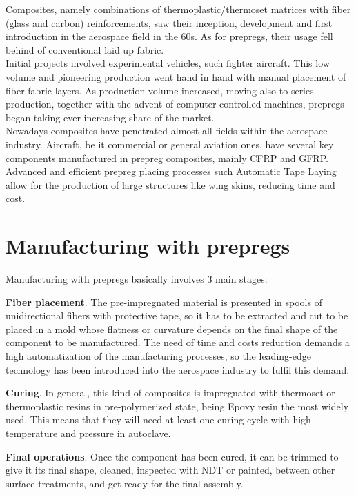 Composites, namely combinations of thermoplastic/thermoset matrices with fiber
(glass and carbon) reinforcements, saw their inception, development and first
introduction in the aerospace field in the 60s. As for prepregs, their usage fell
behind of conventional laid up fabric.\\

Initial projects involved experimental vehicles, such fighter aircraft. This low
volume and pioneering production went hand in hand with manual placement of fiber
fabric layers. As production volume increased, moving also to series production,
together with the advent of computer controlled machines, prepregs began taking
ever increasing share of the market.\\

Nowadays composites have penetrated almost all fields within the aerospace industry.
Aircraft, be it commercial or general aviation ones, have several key components
manufactured in prepreg composites, mainly CFRP and GFRP. Advanced and efficient
prepreg placing processes such Automatic Tape Laying allow for the production
of large structures like wing skins, reducing time and cost.\\

\section{Manufacturing with prepregs}


Manufacturing with prepregs basically involves 3 main stages:

\begin{numeration}
\item\textbf{Fiber placement}. The pre-impregnated material is presented in spools of unidirectional fibers with protective tape, so it has to be extracted and cut to be placed in a mold whose flatness or curvature depends on the final shape of the component to be manufactured. The need of time and costs reduction demands a high automatization of the manufacturing processes, so the leading-edge technology has been introduced into the aerospace industry to fulfil this demand.
\item\textbf{Curing}. In general, this kind of composites is impregnated with thermoset or thermoplastic resins in pre-polymerized state, being Epoxy resin the most widely used. This means that they will need at least one curing cycle with high temperature and pressure in autoclave.
\item\textbf{Final operations}. Once the component has been cured, it can be trimmed to give it its final shape, cleaned, inspected with NDT or painted, between other surface treatments, and get ready for the final assembly.
\end{numeration}


